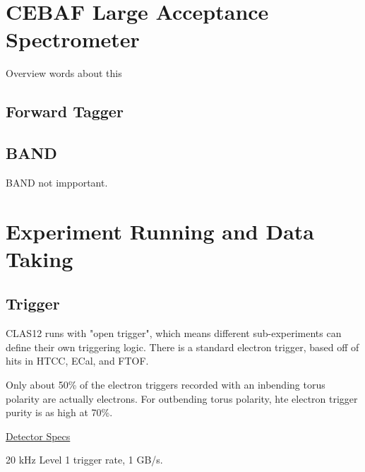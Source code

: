 \section{CEBAF Large Acceptance Spectrometer}
    Overview words about this
    
        

        

        \subsection{Forward Tagger}
        \subsection{BAND}
            BAND not impportant.









        


\section{Experiment Running and Data Taking}

        \subsection{Trigger}
            CLAS12 runs with "open trigger", which means different sub-experiments can define their own triggering logic. There is a standard electron trigger, based off of hits in HTCC, ECal, and FTOF. 

        Only about 50\% of the electron triggers recorded with an inbending torus polarity are actually electrons. For outbending torus polarity, hte electron trigger purity is as high at 70\%. 
    
    \href{https://www.jlab.org/Hall-B/clas12-web/}{Detector Specs}
    
    20 kHz Level 1 trigger rate, 1 GB/s.


    
    

